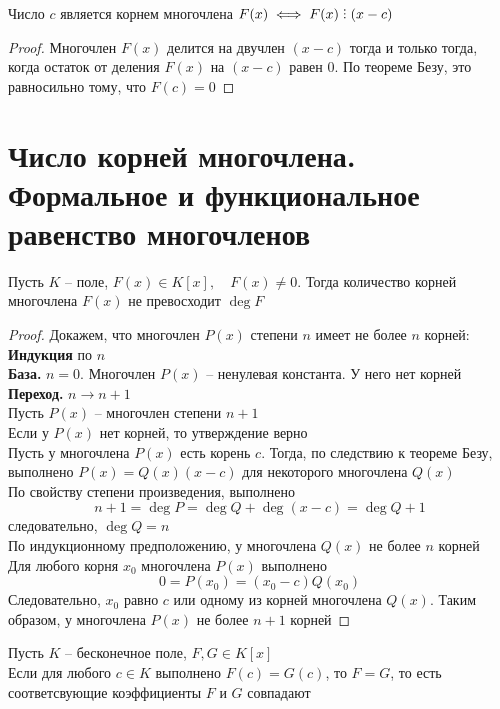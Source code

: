 \begin{implication}
	Число $c$ является корнем многочлена $F(x) \iff F(x) \divby (x - c) $
\end{implication}

\begin{proof}
	Многочлен $F(x)$ делится на двучлен $(x - c)$ тогда и только тогда, когда остаток от деления $F(x)$ на $(x - c)$ равен 0. По теореме Безу, это равносильно тому, что $F(c) = 0$
\end{proof}

\section{Число корней многочлена. Формальное и функциональное равенство многочленов}

\begin{theorem}
	Пусть $K$ -- поле, $F(x) \in K[x], \quad F(x) \ne 0$. Тогда количество корней многочлена $F(x)$ не превосходит $\deg F$
\end{theorem}

\begin{proof}
	Докажем, что многочлен $P(x)$ степени $n$ имеет не более $n$ корней: \\
	\textbf{Индукция} по $n$ \\
	\textbf{База.} $n = 0$. Многочлен $P(x)$ -- ненулевая константа. У него нет корней \\
	\textbf{Переход.} $n \to n + 1$ \\
	Пусть $P(x)$ -- многочлен степени $n + 1$ \\
	Если у $P(x)$ нет корней, то утверждение верно \\
	Пусть у многочлена $P(x)$ есть корень $c$. Тогда, по следствию к теореме Безу, выполнено $P(x) = Q(x)(x - c)$ для некоторого многочлена $Q(x)$ \\
	По свойству степени произведения, выполнено
	$$ n + 1 = \deg P = \deg Q + \deg(x - c) = \deg Q + 1 $$
	следовательно, $\deg Q = n$ \\
	По индукционному предположению, у многочлена $Q(x)$ не более $n$ корней \\
	Для любого корня $x_0$ многочлена $P(x)$ выполнено
	$$ 0 = P(x_0) = (x_0 - c)Q(x_0) $$
	Следовательно, $x_0$ равно $c$ или одному из корней многочлена $Q(x)$. Таким образом, у многочлена $P(x)$ не более $n + 1$ корней
\end{proof}

\begin{implication}
	Пусть $K$ -- бесконечное поле, $F, G \in K[x]$ \\
	Если для любого $c \in K$ выполнено $F(c) = G(c)$, то $F = G$, то есть соответсвующие коэффициенты $F$ и $G$ совпадают
\end{implication}

